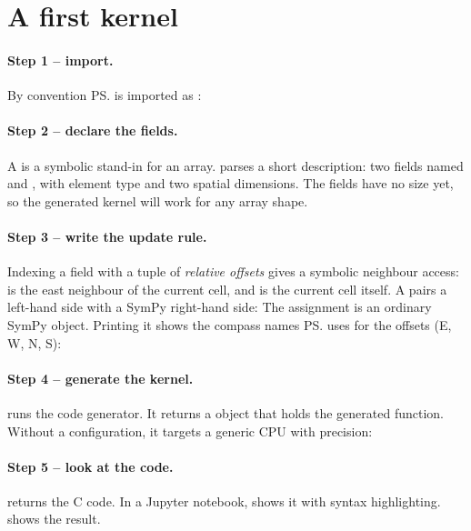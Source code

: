 \section{A first kernel}

\paragraph{Step 1 -- import.} By convention \ps{} is imported as :

\paragraph{Step 2 -- declare the fields.}
A  is a symbolic stand-in for an array.  parses a short
description: two fields named  and , with element type
 and two spatial dimensions. The fields have no size yet, so the generated
kernel will work for any array shape.

\paragraph{Step 3 -- write the update rule.}
Indexing a field with a tuple of \emph{relative offsets} gives a symbolic neighbour
access:  is the east neighbour of the current cell, and
 is the current cell itself. A  pairs a
left-hand side with a SymPy right-hand side:
The assignment is an ordinary SymPy object. Printing it shows the compass names \ps{}
uses for the offsets (E, W, N, S):

\paragraph{Step 4 -- generate the kernel.}
 runs the code generator. It returns a  object that
holds the generated function. Without a configuration, it targets a generic CPU with
 precision:

\paragraph{Step 5 -- look at the code.}
 returns the C code. In a Jupyter notebook,
 shows it with syntax highlighting.
 shows the result.


